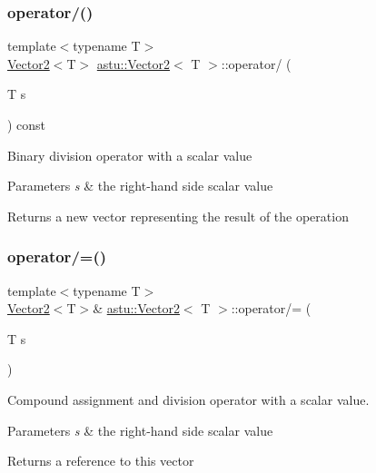 \subsubsection{\texorpdfstring{operator/()}{operator/()}}
{\footnotesize\ttfamily template$<$typename T$>$ \\
\hyperlink{classastu_1_1Vector2}{Vector2}$<$T$>$ \hyperlink{classastu_1_1Vector2}{astu\+::\+Vector2}$<$ T $>$\+::operator/ (\begin{DoxyParamCaption}\item[{T}]{s }\end{DoxyParamCaption}) const\hspace{0.3cm}{\ttfamily [inline]}}

Binary division operator with a scalar value


\begin{DoxyParams}{Parameters}
{\em s} & the right-\/hand side scalar value \\
\hline
\end{DoxyParams}
\begin{DoxyReturn}{Returns}
a new vector representing the result of the operation 
\end{DoxyReturn}
\mbox{\label{classastu_1_1Vector2_a9f9362218a0d011032324cbc7a9a85a1}} 
\subsubsection{\texorpdfstring{operator/=()}{operator/=()}}
{\footnotesize\ttfamily template$<$typename T$>$ \\
\hyperlink{classastu_1_1Vector2}{Vector2}$<$T$>$\& \hyperlink{classastu_1_1Vector2}{astu\+::\+Vector2}$<$ T $>$\+::operator/= (\begin{DoxyParamCaption}\item[{T}]{s }\end{DoxyParamCaption})\hspace{0.3cm}{\ttfamily [inline]}}

Compound assignment and division operator with a scalar value.


\begin{DoxyParams}{Parameters}
{\em s} & the right-\/hand side scalar value \\
\hline
\end{DoxyParams}
\begin{DoxyReturn}{Returns}
a reference to this vector 
\end{DoxyReturn}
\mbox{\label{classastu_1_1Vector2_ada7f1d693330e7671cb1f951d8011c08}} 
